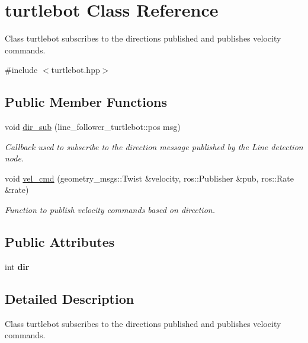 \hypertarget{classturtlebot}{}\section{turtlebot Class Reference}
\label{classturtlebot}


Class turtlebot subscribes to the directions published and publishes velocity commands.  




{\ttfamily \#include $<$turtlebot.\+hpp$>$}

\subsection*{Public Member Functions}
\begin{DoxyCompactItemize}
\item 
void \hyperlink{classturtlebot_a086689860adb5ae052b5b89b17a79b7d}{dir\+\_\+sub} (line\+\_\+follower\+\_\+turtlebot\+::pos msg)
\begin{DoxyCompactList}\small\item\em Callback used to subscribe to the direction message published by the Line detection node. \end{DoxyCompactList}\item 
void \hyperlink{classturtlebot_a644fb3325e04d96fe171f8a773eba6b4}{vel\+\_\+cmd} (geometry\+\_\+msgs\+::\+Twist \&velocity, ros\+::\+Publisher \&pub, ros\+::\+Rate \&rate)
\begin{DoxyCompactList}\small\item\em Function to publish velocity commands based on direction. \end{DoxyCompactList}\end{DoxyCompactItemize}
\subsection*{Public Attributes}
\begin{DoxyCompactItemize}
\item 
int {\bfseries dir}\hypertarget{classturtlebot_a1d9acb8a367d808a4d4c897deab8b20c}{}\label{classturtlebot_a1d9acb8a367d808a4d4c897deab8b20c}

\end{DoxyCompactItemize}


\subsection{Detailed Description}
Class turtlebot subscribes to the directions published and publishes velocity commands. 

